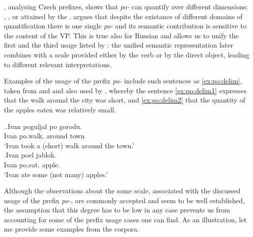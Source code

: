 \citet{Souchkova:04}, analysing Czech prefixes, shows that \textit{po-} can quantify over different dimensions: , , or  attained by the . \citeauthor{Souchkova:04} argues that despite the existance of different domains of quantification there is one single  \textit{po-} and its semantic contribution is sensitive to the content of the VP. This is true also for Russian and allows us to unify the first and the third usage listed by \citet{Shvedova:82}: the unified semantic representation later combines with a scale provided either by the verb or by the direct object, leading to different relevant interpretations.

Examples of the  usage of the prefix \textit{po-} include such sentences as \ref{ex:po:delim}, taken from \citet{Filip:00} and \citet{Souchkova:04} and also used by \citet{Kagan:book}, whereby the sentence \ref{ex:po:delim1} expresses that the walk around the city was short, and \ref{ex:po:delim2} that the quantity of the apples eaten was relatively small.

\ex.\label{ex:po:delim}\ag.\label{ex:po:delim1}Ivan poguljal po gorodu.\\
Ivan po.walk. around town\\
\trans `Ivan took a (short) walk around the town.'\\
\bg.\label{ex:po:delim2}Ivan poel jablok.\\
Ivan po.eat. apple.\\
\trans `Ivan ate some (not many) apples.'


Although the observations about the  some scale, associated with the discussed usage of the prefix \textit{po-}, are commonly accepted and seem to be well established, the assumption that this degree has to be low in any case prevents us from accounting for some of the prefix usage cases one can find. As an illustration, let me provide some examples from the corpora.

